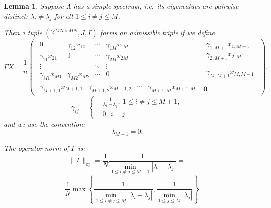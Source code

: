 \documentclass[a4paper]{article}
\newtheorem{lem}{Lemma}
\theoremstyle{definition}
\begin{document}
\begin{lem}
Suppose \( A \) has a simple spectrum,
    i.e.\ its eigenvalues are pairwise distinct:
    \( \lambda_i\neq\lambda_j \) for all \( 1\leq i{\neq}j \leq M \).

    Then a tuple \( (\mathbb{K}^{{MN}{\times}{MN}}, J, \Gamma) \)
        forms an admissible triple if we define
    \[
        \Gamma X = 
            \frac1n \left(\begin{array}{c|c}
            \begin{matrix}
                0               & \gamma_{12}x_{12} & \cdots & \gamma_{1M}x_{1M} \\
                \gamma_{21}x_{21}  & 0              & \cdots & \gamma_{2M}x_{2M} \\
                \vdots          & \vdots         & \ddots & \vdots & \ \\
                \gamma_{M1}x_{M1}  & \gamma_{M2}x_{M2} & \cdots & 0
            \end{matrix} &
            \begin{matrix}
                \gamma_{1,M+1}x_{1,M+1} \\
                \gamma_{2,M+1}x_{2,M+1} \\
                \vdots \\
                \gamma_{M,M+1}x_{M,M+1}
            \end{matrix} \\ \hline
            \begin{matrix}
                \gamma_{M{+}1,1}x_{M{+}1,1} &
                \gamma_{M{+}1,2}x_{M{+}1,2} &
                \cdots &
                \gamma_{M{+}1,M}x_{M{+}1,M}
            \end{matrix} &
            \mathbf{0}
        \end{array}\right),
    \]
    \[
        \gamma_{ij} = \left\{
            \begin{aligned}
                & \frac{1}{\lambda_i - \lambda_j},\ 1\leq i{\neq}j \leq M{+}1,\\
                & 0,\ i=j
            \end{aligned}
            \right.
    \]
    and we use the convention:
    \[
        \lambda_{M{+}1} = 0.
    \]

    The operator norm of \( \Gamma \) is:
    \[
        \|\Gamma\|_{\mathrm{op}} =
        \frac1N
        \frac{1}{\min\limits_{1\leq i{\neq}j \leq M{+}1}|\lambda_i - \lambda_j|} =
        \]
    \[
        = \frac1N
         \max\left\{
         \frac{1}{
             \min\limits_{1\leq i{\neq}j \leq M }{|\lambda_i - \lambda_j|}},
         \frac{1}{
             \min\limits_{1\leq j \leq M}{|\lambda_j|}}
         \right\}
        \]
\end{lem}
\end{document}
